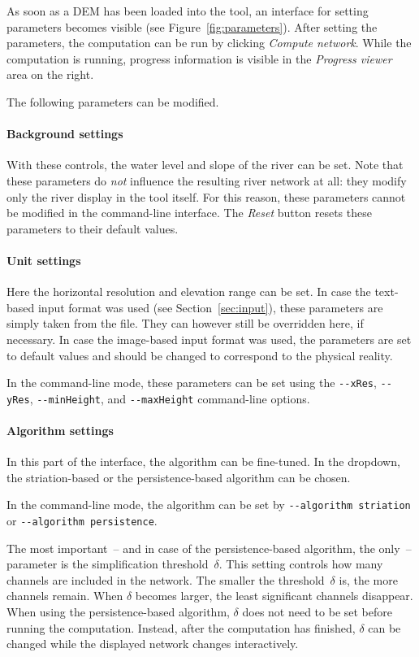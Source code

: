 \documentclass{article}
\begin{document}
As soon as a DEM has been loaded into the tool, an interface for setting parameters becomes visible (see Figure~\ref{fig:parameters}). After setting the parameters, the computation can be run by clicking \emph{Compute network}. While the computation is running, progress information is visible in the \emph{Progress viewer} area on the right.

The following parameters can be modified.

\paragraph{Background settings}
With these controls, the water level and slope of the river can be set. Note that these parameters do \emph{not} influence the resulting river network at all: they modify only the river display in the tool itself. For this reason, these parameters cannot be modified in the command-line interface. The \emph{Reset} button resets these parameters to their default values.

\paragraph{Unit settings}
Here the horizontal resolution and elevation range can be set. In case the text-based input format was used (see Section~\ref{sec:input}), these parameters are simply taken from the file. They can however still be overridden here, if necessary. In case the image-based input format was used, the parameters are set to default values and should be changed to correspond to the physical reality.

In the command-line mode, these parameters can be set using the \texttt{-{}-xRes}, \texttt{-{}-yRes}, \texttt{-{}-minHeight}, and \texttt{-{}-maxHeight} command-line options.

\paragraph{Algorithm settings}
In this part of the interface, the algorithm can be fine-tuned. In the dropdown, the striation-based or the persistence-based algorithm can be chosen.

In the command-line mode, the algorithm can be set by \texttt{-{}-algorithm striation} or \texttt{-{}-algorithm persistence}.

The most important~-- and in case of the persistence-based algorithm, the only~-- parameter is the simplification threshold~$\delta$. This setting controls how many channels are included in the network. The smaller the threshold~$\delta$ is, the more channels remain. When $\delta$ becomes larger, the least significant channels disappear. When using the persistence-based algorithm, $\delta$ does not need to be set before running the computation. Instead, after the computation has finished, $\delta$ can be changed while the displayed network changes interactively.
\end{document}
